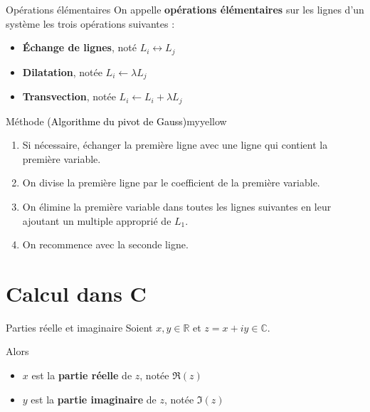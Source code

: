     \begin{defi}{Opérations élémentaires}{}
    On appelle \textbf{opérations élémentaires} sur les lignes d’un système les trois opérations suivantes :
    \begin{itemize}
        \item \textbf{Échange de lignes}, noté $L_i \leftrightarrow L_j$
        \item \textbf{Dilatation}, notée $L_i \leftarrow \lambda L_j$
        \item \textbf{Transvection}, notée $L_i \leftarrow L_i + \lambda L_j$
    \end{itemize}
    \end{defi}

    \begin{omed}{Méthode \textcolor{black}{(Algorithme du pivot de Gauss)}}{myyellow}
	\begin{enumerate}
	\item Si nécessaire, échanger la première ligne avec une ligne qui contient la première variable.
	\item On divise la première ligne par le coefficient de la première variable.
	\item On élimine la première variable dans toutes les lignes suivantes en leur ajoutant un multiple approprié de $L_{1}$.
	\item On recommence avec la seconde ligne.
	\end{enumerate}
    \end{omed}

\section{Calcul dans C}

    \begin{defi}{Parties réelle et imaginaire}{}
	    Soient $x,y \in \mathbb{R}$ et $z = x + iy \in \mathbb{C}$.

	    Alors
	    \begin{itemize}
		    \item $x$ est la \textbf{partie réelle} de $z$, notée $\Re(z)$
		    \item $y$ est la \textbf{partie imaginaire} de $z$, notée $\Im(z)$
	    \end{itemize}
    \end{defi}

